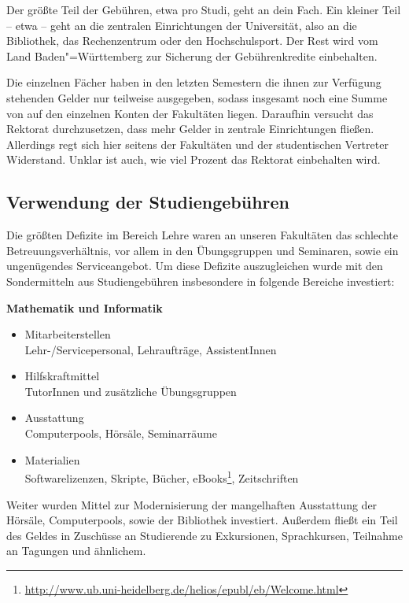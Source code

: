 Der größte Teil der Gebühren, etwa  pro Studi, geht an dein Fach. Ein
kleiner Teil -- etwa  -- geht an die zentralen Einrichtungen der Universität,
also an die Bibliothek, das Rechenzentrum oder den Hochschulsport. Der Rest wird vom
Land Baden"=Württemberg zur Sicherung der Gebührenkredite einbehalten.

Die einzelnen Fächer haben in den letzten Semestern die ihnen zur Verfügung
stehenden Gelder nur teilweise ausgegeben, sodass insgesamt noch eine Summe von
 auf den einzelnen Konten der Fakultäten liegen. Daraufhin
versucht das Rektorat durchzusetzen, dass mehr Gelder in zentrale Einrichtungen
fließen. Allerdings regt sich hier seitens der Fakultäten und der studentischen
Vertreter Widerstand. Unklar ist auch, wie viel Prozent das Rektorat einbehalten
wird.


\subsection*{Verwendung der Studiengebühren}

Die größten Defizite im Bereich Lehre waren an unseren Fakultäten das schlechte
Betreuungsverhältnis, vor allem in den Übungsgruppen und Seminaren, sowie ein
ungenügendes Serviceangebot. Um diese Defizite auszugleichen wurde mit den
Sondermitteln aus Studiengebühren insbesondere in folgende Bereiche investiert:

\vspace{5mm}
\textbf{Mathematik und Informatik}
\begin{itemize}
 \item {Mitarbeiterstellen}\\Lehr-/Servicepersonal, Lehraufträge, AssistentInnen
\item {Hilfskraftmittel}\\ TutorInnen und zusätzliche Übungsgruppen
\item {Ausstattung}\\ Computerpools, Hörsäle, Seminarräume
\item {Materialien}\\ Softwarelizenzen, Skripte, Bücher, eBooks\footnote{\url{http://www.ub.uni-heidelberg.de/helios/epubl/eb/Welcome.html}}, Zeitschriften
\end{itemize}

Weiter wurden Mittel zur Modernisierung der mangelhaften Ausstattung der Hörsäle,
Computerpools, sowie der Bibliothek investiert. Außerdem fließt ein Teil des Geldes
in Zuschüsse an Studierende zu Exkursionen, Sprachkursen, Teilnahme an Tagungen und
ähnlichem.

